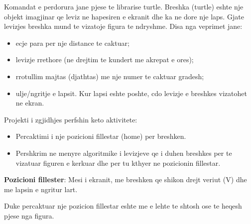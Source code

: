 \documentclass[pdftex,12pt]{artikel3}
\begin{document}
Komandat e perdorura jane pjese te librarise turtle. Breshka (turtle) eshte nje objekt imagjinar qe leviz ne hapesiren 
e ekranit dhe ka ne dore nje laps. Gjate levizjes breshka mund te vizatoje figura te ndryshme. Disa nga veprimet jane:
\begin{itemize}
\item ecje para per nje distance te caktuar;
\item levizje rrethore (ne drejtim te kundert me akrepat e ores);
\item rrotullim majtas (djathtas) me nje numer te caktuar gradesh;
\item ulje/ngritje e lapsit. Kur lapsi eshte poshte, cdo levizje e breshkes vizatohet ne ekran. 
\end{itemize}

Projekti i zgjidhjes perfshin keto aktivitete:
\begin{itemize}
\item Percaktimi i nje pozicioni fillestar (home) per breshken.
\item Pershkrim ne menyre algoritmike i levizjeve qe i duhen breshkes per te vizatuar figuren e kerkuar dhe per tu kthyer 
ne pozicionin fillestar.
\end{itemize}

{\bf Pozicioni fillester}: Mesi i ekranit, me breshken qe shikon drejt veriut (V)
dhe me lapsin e ngritur lart.

Duke percaktuar nje pozicion fillestar eshte me e lehte te shtosh ose te heqesh pjese nga figura.

\end{document}
